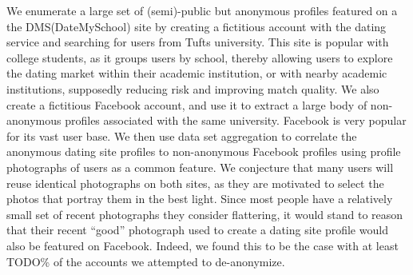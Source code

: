 We enumerate a large set of (semi)-public but anonymous profiles featured on a the DMS(DateMySchool\cite{dms2014}) site by creating a fictitious account with the dating service and searching for users from Tufts university.
This site is popular with college students, as it groups users by school, thereby allowing users to explore the dating market within their academic institution, or with nearby academic institutions, supposedly reducing risk and improving match quality.
We also create a fictitious Facebook\cite{fb2014} account, and use it to extract a large body of non-anonymous profiles associated with the same university.
Facebook is very popular for its vast user base.
We then use data set aggregation to correlate the anonymous dating site profiles to non-anonymous Facebook profiles using profile photographs of users as a common feature.
We conjecture that many users will reuse identical photographs on both sites, as they are motivated to select the photos that portray them in the best light.
Since most people have a relatively small set of recent photographs they consider flattering, it would stand to reason that their recent ``good'' photograph used to create a dating site profile would also be featured on Facebook.
Indeed, we found this to be the case with at least TODO\% of the accounts we attempted to de-anonymize.

